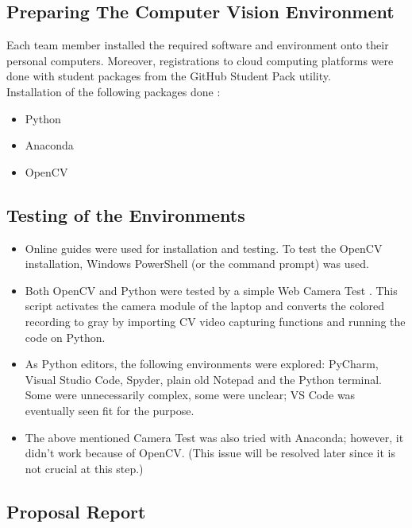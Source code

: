 \subsection{Preparing The Computer Vision Environment}
Each team member installed the required software and environment onto their personal computers. Moreover, registrations to cloud computing platforms were done with student packages from the GitHub Student Pack utility\cite{cite:github_studentPack}. \\

Installation of the following packages done : 
\begin{itemize}
    \item Python
    \item Anaconda
    \item OpenCV
\end{itemize}

\subsection{Testing of the Environments}

\begin{itemize}
    \item Online guides \cite{cite:OCV} were used for installation and testing. To test the OpenCV installation, Windows PowerShell (or the command prompt) was used.
    \item Both OpenCV and Python were tested by a simple Web Camera Test \cite{cite:WCT}. This script activates the camera module of the laptop and converts the colored recording to gray by importing CV video capturing functions and running the code on Python. 
    \item As Python editors, the following environments were explored: PyCharm, Visual Studio Code, Spyder, plain old Notepad and the Python terminal. Some were unnecessarily complex, some were unclear; VS Code was eventually seen fit for the purpose.
    
    \item The above mentioned Camera Test was also tried with Anaconda; however, it didn't work because of OpenCV. (This issue will be resolved later since it is not crucial at this step.)
\end{itemize}

\subsection{Proposal Report}

